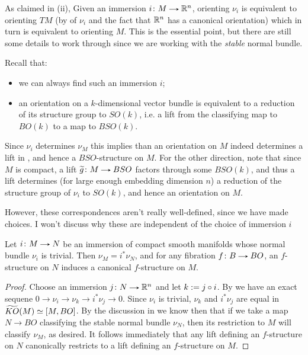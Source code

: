 \begin{remarks} \label{f-structure-explanation}
  As claimed in (ii), Given an immersion $i \c M \to
  \R^n$, orienting $\nu_i$ is equivalent to orienting $TM$ (by
   of $\nu_i$ and the fact that $\mathbb{R}^n$ has a
  canonical orientation) which in turn is equivalent to orienting
  $M$. This is the essential point, but there are still some details
  to work through since we are working with the \emph{stable} normal
  bundle.

  Recall that:
  \begin{itemize}
  \item we can always find such an immersion $i$;
  \item an orientation on a $k$-dimensional vector bundle is
    equivalent to a reduction of its structure group to $SO(k)$,
    i.e. a lift from the classifying map to $BO(k)$ to a map to
    $BSO(k)$.
  \end{itemize}
  Since $\nu_i$ determines $\nu_M$ this implies than an orientation on
  $M$ indeed determines a lift in , and hence a
  $BSO$-structure on $M$. For the other direction, note that since $M$
  is compact, a lift $\til g \c M \to BSO$ factors through some
  $BSO(k)$, and thus a lift determines (for large enough embedding
  dimension $n$) a reduction of the structure group of $\nu_i$ to
  $SO(k)$, and hence an orientation on $M$.

  However, these correspondences aren't really well-defined, since we
  have made choices. I won't discuss why these are independent of the
  choice of immersion $i$
\end{remarks}

\begin{proposition} \label{trivial-normal}
  Let $i \c M \to N$ be an immersion of compact smooth manifolds whose
  normal bundle $\nu_i$ is trivial. Then $\nu_M = i^*\nu_N$, and for
  any fibration $f \c B \to BO$, an $f$-structure on $N$ induces a
  canonical $f$-structure on $M$.
\end{proposition}

\begin{proof}
  Choose an immersion $j \c N \to \R^n$ and let $k \mathrel{:=} j \circ i$. By
   we have an exact sequene $0 \to \nu_i \to
  \nu_k \to i^*\nu_j \to 0$. Since $\nu_i$ is trivial, $\nu_k$ and
  $i^*\nu_j$ are equal in $\widetilde{KO}(M) \simeq [M,BO]$. By the discussion
  in  we know then that if we take a map $N \to BO$
  classifying the stable normal bundle $\nu_N$, then its restriction
  to $M$ will classify $\nu_M$, as desired. It follows immediately
  that any lift defining an $f$-structure on $N$ canonically restricts
  to a lift defining an $f$-structure on $M$.
\end{proof}

